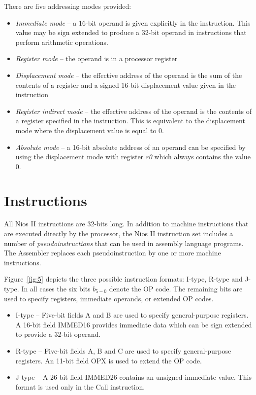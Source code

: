 \documentclass[11pt, twoside, pdftex]{article}
\begin{document}
There are five addressing modes provided:
\begin{itemize}
\item {\it Immediate mode} -- a 16-bit operand is given explicitly in the instruction. 
This value may be sign extended to produce a 32-bit operand in instructions that perform 
arithmetic operations.
\item {\it Register mode} -- the operand is in a processor register
\item {\it Displacement mode} -- the effective address of the operand is the sum of the 
contents of a register and a signed 16-bit displacement value given in the instruction
\item {\it Register indirect mode} -- the effective address of the operand is the contents
of a register specified in the instruction. This is equivalent to the displacement mode
where the displacement value is equal to 0.
\item {\it Absolute mode} -- a 16-bit absolute address of an operand can be specified
by using the displacement mode with register {\it r0} which always contains the value 0.
\end{itemize}

\section{Instructions}

All Nios II instructions are 32-bits long. In addition to machine instructions that are
executed directly by the processor, the Nios II instruction set includes a number of
{\it pseudoinstructions} that can be used in assembly language programs. 
The Assembler replaces each pseudoinstruction by one or more machine instructions.

Figure~\ref{fig:5} depicts the three possible instruction formats: I-type, R-type and J-type.
In all cases the six bits $b_{5-0}$ denote the OP code. The remaining bits are used to
specify registers, immediate operands, or extended OP codes. 
\begin{itemize}
\item I-type -- Five-bit fields A and B are used to specify general-purpose registers.
A 16-bit field IMMED16 provides immediate data which can be sign extended to provide a
32-bit operand.
\item R-type -- Five-bit fields A, B and C are used to specify general-purpose registers.
An 11-bit field OPX is used to extend the OP code.
\item J-type -- A 26-bit field IMMED26 contains an unsigned immediate value. This format is
used only in the Call instruction.
\end{itemize}
 
\end{document}
